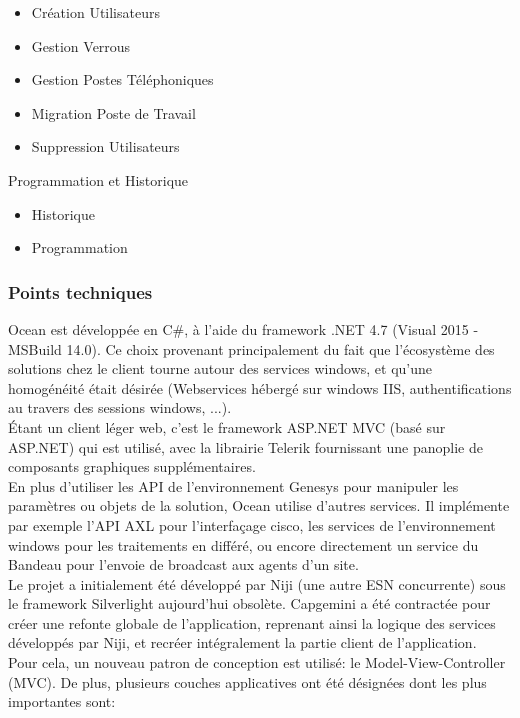 \documentclass{rapport}
\begin{document}
\begin{itemize}
\begin{minipage}{0.5\textwidth}
        \begin{itemize}
        \item Création Utilisateurs
        \item Gestion Verrous
        \item Gestion Postes Téléphoniques
        \item Migration Poste de Travail
        \item Suppression Utilisateurs
        \end{itemize}
    \vspace{5mm} %
    \item Programmation et Historique
        \begin{itemize}
        \item Historique
        \item Programmation
        \end{itemize}
\end{minipage}
\end{itemize}


\subsubsection{Points techniques}

Ocean est développée en C\#, à l'aide du framework .NET 4.7 (Visual 2015 - MSBuild 14.0). Ce choix provenant principalement du fait que l'écosystème des solutions chez le client tourne autour des services windows, et qu'une homogénéité était désirée (Webservices hébergé sur windows IIS, authentifications au travers des sessions windows, ...).\\
Étant un client léger web, c'est le framework ASP.NET MVC (basé sur ASP.NET) qui est utilisé, avec la librairie Telerik fournissant une panoplie de composants graphiques supplémentaires.\\

En plus d'utiliser les API de l'environnement Genesys pour manipuler les paramètres ou objets de la solution, Ocean utilise d'autres services. Il implémente par exemple l'API AXL pour l'interfaçage cisco, les services de l'environnement windows pour les traitements en différé, ou encore directement un service du Bandeau pour l'envoie de broadcast aux agents d'un site.\\

Le projet a initialement été développé par Niji (une autre ESN concurrente) sous le framework Silverlight aujourd'hui obsolète. Capgemini a été contractée pour créer une refonte globale de l'application, reprenant ainsi la logique des services développés par Niji, et recréer intégralement la partie client de l'application.\\
Pour cela, un nouveau patron de conception est utilisé: le Model-View-Controller (MVC). De plus, plusieurs couches applicatives ont été désignées dont les plus importantes sont:\\
\end{document}
